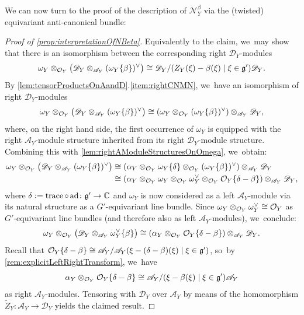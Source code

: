 \documentclass[11pt]{article}
\newcommand{\cA}{\mathscr{A}}
\newcommand{\frg}{\mathfrak{g}}
\DeclareMathOperator{\ad}{ad}
\DeclareMathOperator{\trace}{trace}
\begin{document}
We can now turn to the proof of the description of $\mathscr N_Y^\beta$ via the (twisted) equivariant
anti-canonical bundle:

\begin{proof}[Proof of \cref{prop:interpretationOfNBeta}]
Equivalently to the claim, we~may show that there is an isomorphism between the corresponding right $\mathscr{D}_Y$\nobreakdash-mod\-ules
\[
\omega_Y \otimes_{\O_Y} \big(\mathscr{D}_Y \otimes_{\cA_Y} (\omega_Y\{\beta\})^\vee\big) \cong \mathscr{D}_Y / (Z_Y(\xi)-\beta(\xi) \mid \xi \in \frg') \mathscr{D}_Y.
\]
By \cref{lem:tensorProductsOnAandD}.\cref{item:rightCNMN}, we~have an isomorphism of right $\mathscr{D}_Y$\nobreakdash-mod\-ules
\[
\omega_Y \otimes_{\O_Y} \big(\mathscr{D}_Y \otimes_{\cA_Y} (\omega_Y\{\beta\})^\vee\big) \cong (\omega_Y \otimes_{\O_Y} (\omega_Y\{\beta\})^\vee) \otimes_{\cA_Y} \mathscr{D}_Y,
\]
where, on the right hand side, the first occurrence of $\omega_Y$ is equipped with the right $\cA_Y$\nobreakdash-mod\-ule structure inherited from its right $\mathscr{D}_Y$\nobreakdash-mod\-ule structure. Combining this with \cref{lem:rightAModuleStructuresOnOmega}, we~obtain:
\begin{align*}
\omega_Y \otimes_{\O_Y} \big(\mathscr{D}_Y \otimes_{\cA_Y} (\omega_Y\{\beta\})^\vee\big)
&\cong (\alpha_Y \otimes_{\O_Y} \omega_Y\{\delta\} \otimes_{\O_Y} (\omega_Y\{\beta\})^\vee) \otimes_{\cA_Y} \mathscr{D}_Y \\
&\cong (\alpha_Y \otimes_{\O_Y} \omega_Y \otimes_{\O_Y} \omega_Y^\vee \otimes_{\O_Y} \O_Y\{\delta-\beta\}) \otimes_{\cA_Y} \mathscr{D}_Y,
\end{align*}
where $\delta := \trace \circ \ad \colon \frg' \to \C$ and $\omega_Y$ is now considered as a left $\cA_Y$\nobreakdash-mod\-ule via its natural structure as a $G'$-equivariant line bundle. Since $\omega_Y \otimes_{\mathcal{O}_Y} \omega_Y^\vee \cong \mathcal{O}_Y$ as $G'$-equivariant line bundles (and therefore also as left $\cA_Y$\nobreakdash-mod\-ules), we~conclude:
\[
\omega_Y \otimes_{\O_Y} \big(\mathscr{D}_Y \otimes_{\cA_Y} \omega_Y^\vee\{\beta\}\big) \cong (\alpha_Y \otimes_{\O_Y} \O_Y\{\delta-\beta\}) \otimes_{\cA_Y} \mathscr{D}_Y.
\]
Recall that $\O_Y\{\delta-\beta\} \cong \cA_Y/\cA_Y(\xi-(\delta-\beta)(\xi) \mid \xi \in \frg')$, so~by \cref{rem:explicitLeftRightTransform}, we~have
\[
\alpha_Y \otimes_{\O_Y} \O_Y\{\delta-\beta\} \cong \cA_Y/(\xi-\beta(\xi) \mid \xi \in \frg') \cA_Y
\]
as right $\cA_Y$\nobreakdash-mod\-ules. Tensoring with $\mathscr{D}_Y$ over $\cA_Y$ by means of the homomorphism $\tilde{Z}_Y \colon \cA_Y \to \mathscr D_Y$ yields the claimed result.
\end{proof}
\end{document}
